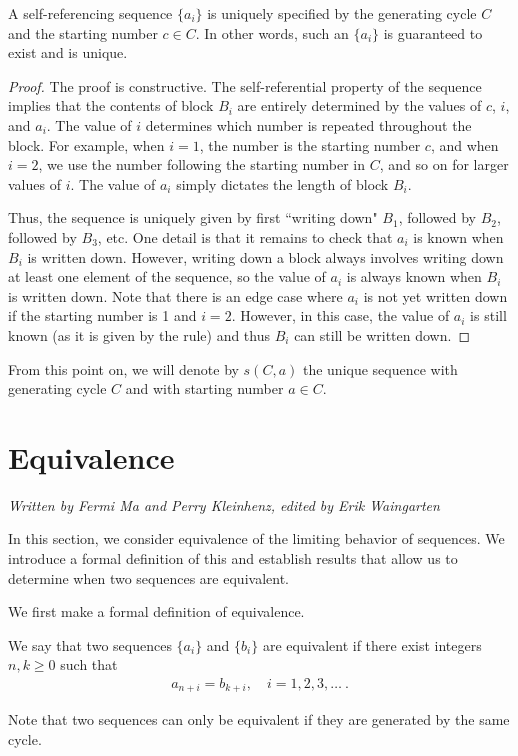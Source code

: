 \documentclass[runningheads,a4paper]{llncs}
\begin{document}
\begin{proposition}
A self-referencing sequence $\{a_i\}$ is uniquely specified by the generating cycle $C$ and the starting number $c \in C$. In other words, such an $\{a_i\}$ is guaranteed to exist and is unique.
\end{proposition}
\begin{proof} 
The proof is constructive. The self-referential property of the sequence implies that the contents of block $B_i$ are entirely determined by the values of $c$, $i$, and $a_i$. The value of $i$ determines which number is repeated throughout the block. For example, when $i = 1$, the number is the starting number $c$, and when $i = 2$, we use the number following the starting number in $C$, and so on for larger values of $i$. The value of $a_i$ simply dictates the length of block $B_i$.

Thus, the sequence is uniquely given by first ``writing down" $B_1$, followed by $B_2$, followed by $B_3$, etc. One detail is that it remains to check that $a_i$ is known when $B_i$ is written down. However, writing down a block always involves writing down at least one element of the sequence, so the value of $a_i$ is always known when $B_i$ is written down. Note that there is an edge case where $a_i$ is not yet written down if the starting number is 1 and $i =2$. However, in this case, the value of $a_i$ is still known (as it is given by the rule) and thus $B_i$ can still be written down.
\end{proof}

From this point on, we will denote by $s(C,a)$ the unique sequence with generating cycle $C$ and with starting number $a \in C$.

\section{Equivalence}
\label{equivalence}
\emph{Written by Fermi Ma and Perry Kleinhenz, edited by Erik Waingarten}

In this section, we consider equivalence of the limiting behavior of sequences. We introduce a formal definition of this and establish results that allow us to determine when two sequences are equivalent.  

We first make a formal definition of equivalence. 
\begin{definition}
We say that two sequences $\{a_i\}$ and $\{b_i\}$ are equivalent if there exist integers $n, k \geq 0$ such that 
\begin{align*}
a_{n+i} = b_{k+i}, \quad i=1,2,3,\ldots \ .
\end{align*}
\end{definition}
Note that two sequences can only be equivalent if they are generated by the same cycle.
\end{document}
